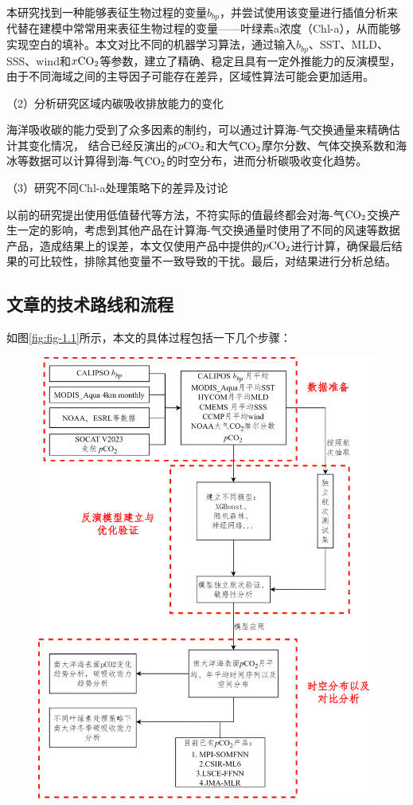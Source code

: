 本研究找到一种能够表征生物过程的变量$b_{bp}$，并尝试使用该变量进行插值分析来代替在建模中常常用来表征生物过程的变量——叶绿素a浓度（Chl-a），从而能够实现空白的填补。本文对比不同的机器学习算法，通过输入$b_{bp}$、SST、MLD、SSS、wind和$x\rm CO_2$等参数，建立了精确、稳定且具有一定外推能力的反演模型，由于不同海域之间的主导因子可能存在差异，区域性算法可能会更加适用。

（2）分析研究区域内碳吸收排放能力的变化

海洋吸收碳的能力受到了众多因素的制约，可以通过计算海-气交换通量来精确估计其变化情况，
结合已经反演出的$p\rm CO_2$和大气$\rm CO_2$摩尔分数、气体交换系数和海冰等数据可以计算得到海-气$\rm CO_2$的时空分布，进而分析碳吸收变化趋势。

（3）研究不同Chl-a处理策略下的差异及讨论

以前的研究提出使用低值替代等方法，不符实际的值最终都会对海-气$\rm CO_2$交换产生一定的影响，考虑到其他产品在计算海-气交换通量时使用了不同的风速等数据产品，造成结果上的误差，本文仅使用产品中提供的$p\rm CO_2$进行计算，确保最后结果的可比较性，排除其他变量不一致导致的干扰。最后，对结果进行分析总结。

\subsection{文章的技术路线和流程}
如图\ref{fig:fig-1.1}所示，本文的具体过程包括一下几个步骤：
\begin{figure}[htbp]
    \centering
    \includegraphics[width=\linewidth]{figure/论文框架.png}
\end{figure}

